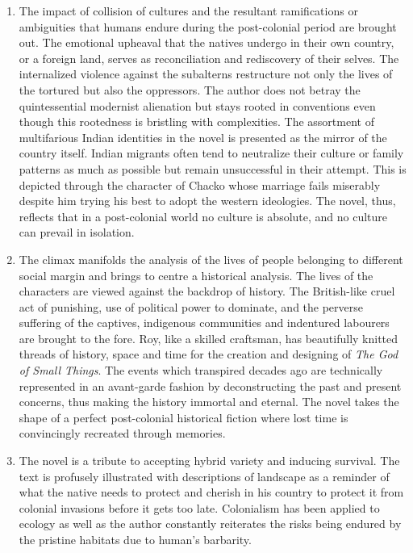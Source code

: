 \begin{enumerate}
  \item The impact of collision of cultures and the resultant ramifications or ambiguities that humans endure during the post-colonial period are brought out.  The emotional upheaval that the natives undergo in their own country, or a foreign land, serves as reconciliation and rediscovery of their selves.  The internalized violence against the subalterns restructure not only the lives of the tortured but also the oppressors. The author does not betray the quintessential modernist alienation but stays rooted in conventions even though this rootedness is bristling with complexities. The assortment of multifarious Indian identities in the novel is presented as the mirror of the country itself.  Indian migrants often tend to neutralize their culture or family patterns as much as possible but remain unsuccessful in their attempt. This is depicted through the character of Chacko whose marriage fails miserably despite him trying his best to adopt the western ideologies. The novel, thus, reflects that in a post-colonial world no culture is absolute, and no culture can prevail in isolation.

  \item The climax manifolds the analysis of the lives of people belonging to different social margin and brings to centre a historical analysis.  The lives of the characters are viewed against the backdrop of history.  The British-like cruel act of punishing, use of political power to dominate, and the perverse suffering of the captives, indigenous communities and indentured labourers are brought to the fore.  Roy, like a skilled craftsman, has beautifully knitted threads of history, space and time for the creation and designing of \emph{The God of Small Things}.  The events which transpired decades ago are technically represented in an avant-garde fashion by deconstructing the past and present concerns, thus making the history immortal and eternal. The novel takes the shape of a perfect post-colonial historical fiction where lost time is convincingly recreated through memories.

  \item The novel is a tribute to accepting hybrid variety and inducing survival.  The text is profusely illustrated with descriptions of landscape as a reminder of what the native needs to protect and cherish in his country to protect it from colonial invasions before it gets too late. Colonialism has been applied to ecology as well as the author constantly reiterates the risks being endured by the pristine habitats due to human's barbarity.


\end{enumerate}
